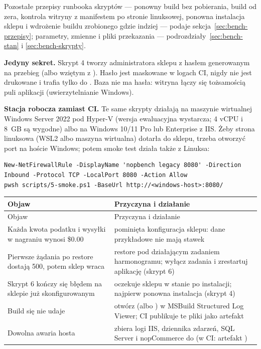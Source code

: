 Pozostałe przepisy runbooka skryptów --- ponowny build bez pobierania, build od zera,
kontrola witryny z manifestem po stronie linuksowej, ponowna instalacja sklepu i wdrożenie
buildu zrobionego gdzie indziej --- podaje sekcja~\ref{sec:bench-przepisy}; parametry,
zmienne i pliki przekazania --- podrozdziały~\ref{sec:bench-stan} i \ref{sec:bench-skrypty}.

\textbf{Jedyny sekret.} Skrypt 4 tworzy administratora sklepu z hasłem generowanym na
przebieg (albo wziętym z ). Hasło jest maskowane w
logach CI, nigdy nie jest drukowane i trafia tylko do
. Baza nie ma hasła: witryna łączy się tożsamością
puli aplikacji (uwierzytelnianie Windows).

\textbf{Stacja robocza zamiast CI.} Te same skrypty działają na maszynie wirtualnej
Windows Server 2022 pod Hyper-V (wersja ewaluacyjna wystarcza; 4 vCPU i 8~GB są wygodne)
albo na Windows 10/11 Pro lub Enterprise z IIS. Żeby strona linuksowa (WSL2 albo maszyna
wirtualna) dotarła do sklepu, trzeba otworzyć port na hoście Windows; potem smoke test
działa także z Linuksa:

\begin{lstlisting}
New-NetFirewallRule -DisplayName 'nopbench legacy 8080' -Direction Inbound -Protocol TCP -LocalPort 8080 -Action Allow
pwsh scripts/5-smoke.ps1 -BaseUrl http://<windows-host>:8080/
\end{lstlisting}

\begin{xltabular}{\linewidth}{@{}>{\raggedright\arraybackslash}p{5.6cm} >{\raggedright\arraybackslash}X@{}}
\toprule
Objaw & Przyczyna i działanie \\
\midrule
\endfirsthead
\toprule
Objaw & Przyczyna i działanie \\
\midrule
\endhead
Każda kwota podatku i wysyłki w nagraniu wynosi \$0.00 & pominięta konfiguracja sklepu: dane przykładowe nie mają stawek \\
Pierwsze żądania po restore dostają 500, potem sklep wraca & restore pod działającym zadaniem harmonogramu; wyłącz zadania i zrestartuj aplikację (skrypt 6) \\
Skrypt 6 kończy się błędem na sklepie już skonfigurowanym & oczekuje sklepu w stanie po instalacji; najpierw ponowna instalacja (skrypt 4) \\
Build się nie udaje & otwórz  (albo ) w MSBuild Structured Log Viewer; CI publikuje te pliki jako artefakt  \\
Dowolna awaria hosta &  zbiera logi IIS, dziennika zdarzeń, SQL Server i nopCommerce do  (w CI: artefakt ) \\
\bottomrule
\end{xltabular}


